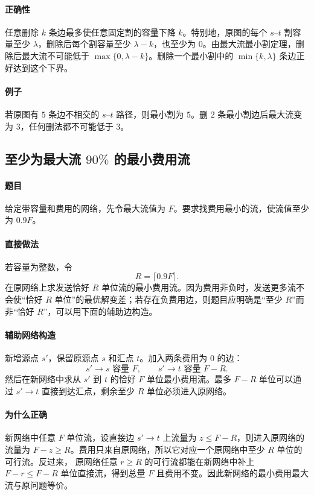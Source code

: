 \documentclass[UTF8,openany,12pt]{ctexbook}
\theoremstyle{remark}
\begin{document}
\paragraph{正确性}
任意删除 $k$ 条边最多使任意固定割的容量下降 $k$。特别地，原图的每个 $s$--$t$ 割容量至少
$\lambda$，删除后每个割容量至少 $\lambda-k$，也至少为 $0$。由最大流最小割定理，删除后最大流不可能低于 $\max\{0,\lambda-k\}$。删除一个最小割中的
$\min\{k,\lambda\}$ 条边正好达到这个下界。

\paragraph{例子}
若原图有 $5$ 条边不相交的 $s$--$t$ 路径，则最小割为 $5$。删 $2$ 条最小割边后最大流变为
$3$，任何删法都不可能低于 $3$。

\subsection[至少为最大流 90\% 的最小费用流]{至少为最大流 $90\%$ 的最小费用流}

\paragraph{题目}
给定带容量和费用的网络，先令最大流值为 $F$。要求找费用最小的流，使流值至少为
$0.9F$。

\paragraph{直接做法}
若容量为整数，令
\[
  R=\lceil 0.9F\rceil.
\]
在原网络上求发送恰好 $R$ 单位流的最小费用流。因为费用非负时，发送更多流不会使“恰好
$R$ 单位”的最优解变差；若存在负费用边，则题目应明确是“至少 $R$”而非“恰好 $R$”，可以用下面的辅助边构造。

\paragraph{辅助网络构造}
新增源点 $s'$，保留原源点 $s$ 和汇点 $t$。加入两条费用为 $0$ 的边：
\[
  s'\to s \text{ 容量 }F,\qquad s'\to t \text{ 容量 }F-R.
\]
然后在新网络中求从 $s'$ 到 $t$ 的恰好 $F$ 单位最小费用流。最多 $F-R$ 单位可以通过
$s'\to t$ 直接到达汇点，剩余至少 $R$ 单位必须进入原网络。

\paragraph{为什么正确}
新网络中任意 $F$ 单位流，设直接边 $s'\to t$ 上流量为 $z\le F-R$，则进入原网络的流量为
$F-z\ge R$。费用只来自原网络，所以它对应一个原网络中至少 $R$ 单位的可行流。反过来，
原网络任意 $r\ge R$ 的可行流都能在新网络中补上 $F-r\le F-R$ 单位直接流，得到总量
$F$ 且费用不变。因此新网络的最小费用最大流与原问题等价。
\end{document}
